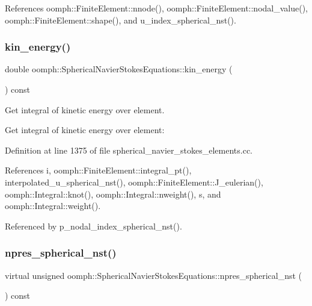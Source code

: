 References oomph\+::\+Finite\+Element\+::nnode(), oomph\+::\+Finite\+Element\+::nodal\+\_\+value(), oomph\+::\+Finite\+Element\+::shape(), and u\+\_\+index\+\_\+spherical\+\_\+nst().

\mbox{\label{classoomph_1_1SphericalNavierStokesEquations_aa374af3cc246ada66f17b19a9564a6d3}} 
\subsubsection{\texorpdfstring{kin\+\_\+energy()}{kin\_energy()}}
{\footnotesize\ttfamily double oomph\+::\+Spherical\+Navier\+Stokes\+Equations\+::kin\+\_\+energy (\begin{DoxyParamCaption}{ }\end{DoxyParamCaption}) const}



Get integral of kinetic energy over element. 

Get integral of kinetic energy over element\+: 

Definition at line 1375 of file spherical\+\_\+navier\+\_\+stokes\+\_\+elements.\+cc.



References i, oomph\+::\+Finite\+Element\+::integral\+\_\+pt(), interpolated\+\_\+u\+\_\+spherical\+\_\+nst(), oomph\+::\+Finite\+Element\+::\+J\+\_\+eulerian(), oomph\+::\+Integral\+::knot(), oomph\+::\+Integral\+::nweight(), s, and oomph\+::\+Integral\+::weight().



Referenced by p\+\_\+nodal\+\_\+index\+\_\+spherical\+\_\+nst().

\mbox{\label{classoomph_1_1SphericalNavierStokesEquations_ae01203564bc66dacf84c1ed65e4b7930}} 
\subsubsection{\texorpdfstring{npres\+\_\+spherical\+\_\+nst()}{npres\_spherical\_nst()}}
{\footnotesize\ttfamily virtual unsigned oomph\+::\+Spherical\+Navier\+Stokes\+Equations\+::npres\+\_\+spherical\+\_\+nst (\begin{DoxyParamCaption}{ }\end{DoxyParamCaption}) const\hspace{0.3cm}{\ttfamily [pure virtual]}}



